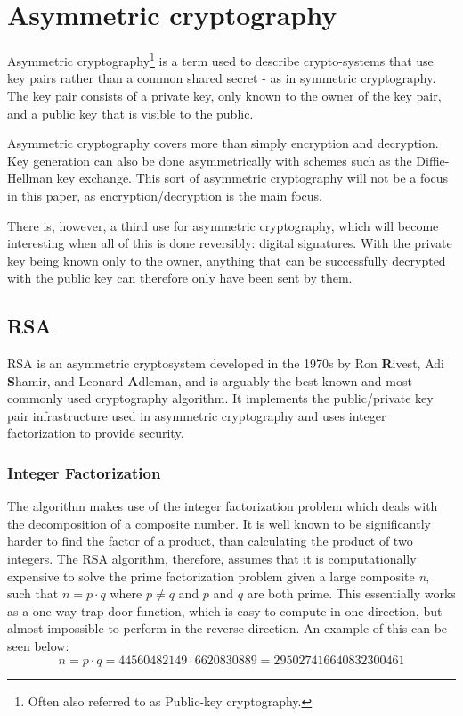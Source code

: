 
\section{Asymmetric cryptography}
\label{Async}
Asymmetric cryptography\footnote{Often also referred to as Public-key cryptography.} is a term used to describe crypto-systems that use key pairs rather than a common shared secret - as in symmetric cryptography. The key pair consists of a private key, only known to the owner of the key pair, and a public key that is visible to the public.

Asymmetric cryptography covers more than simply encryption and decryption. Key generation can also be done asymmetrically with schemes such as the Diffie-Hellman key exchange. This sort of asymmetric cryptography will not be a focus in this paper, as encryption/decryption is the main focus.

There is, however, a third use for asymmetric cryptography, which will become interesting when all of this is done reversibly: digital signatures. With the private key being known only to the owner, anything that can be successfully decrypted with the public key can therefore only have been sent by them.
\subsection{RSA}
\label{RSA}
RSA is an asymmetric cryptosystem developed in the 1970s by Ron \textbf{R}ivest, Adi \textbf{S}hamir, and Leonard \textbf{A}dleman, and is arguably the best known and most commonly used cryptography algorithm\cite{RSA}. It implements the public/private key pair infrastructure used in asymmetric cryptography and uses integer factorization to provide security.

\subsubsection{Integer Factorization}
The algorithm makes use of the integer factorization problem which deals with the decomposition of a composite number\cite{integerfactor}. It is well known to be significantly harder to find the factor of a product, than calculating the product of two integers. The RSA algorithm, therefore, assumes that it is computationally expensive to solve the prime factorization problem given a large composite \textit{n}, such that $n=p \cdot q$ where $p\neq q$ and $p$ and $q$ are both prime\cite{RSA}. This essentially works as a one-way trap door function, which is easy to compute in one direction, but almost impossible to perform in the reverse direction. An example of this can be seen below:
$$n = p \cdot q = 44560482149 \cdot 6620830889=295027416640832300461$$


